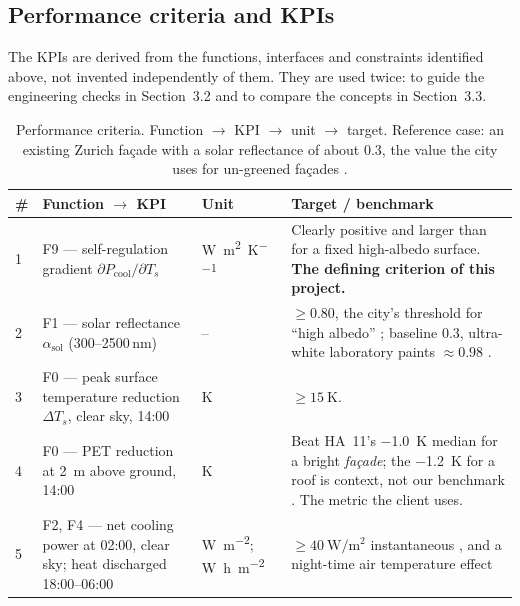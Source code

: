 \subsection{Performance criteria and KPIs}
\label{sec:kpi}

The KPIs are derived from the functions, interfaces and constraints identified
above, not invented independently of them. They are used twice: to guide the
engineering checks in Section~3.2 and to compare the concepts in Section~3.3.

\begin{table}[htbp]
\centering
\caption{Performance criteria. Function $\rightarrow$ KPI $\rightarrow$ unit
$\rightarrow$ target. Reference case: an existing Zurich façade with a solar
reflectance of about $0.3$, the value the city uses for un-greened façades
\parencite[114]{stadtzuerich2020}.}
\label{tab:kpi}
\renewcommand{\arraystretch}{1.05}
\footnotesize
\begin{tabularx}{\textwidth}{L{0.4cm} L{4.3cm} L{1.4cm} X}
\toprule
\textbf{\#} & \textbf{Function $\rightarrow$ KPI} & \textbf{Unit} & \textbf{Target / benchmark} \\
 & F9 --- self-regulation gradient
    $\partial P_\mathrm{cool}/\partial T_s$
  & \unit{\watt\per\square\metre\per\kelvin}
  & Clearly positive and larger than for a fixed high-albedo surface.
    \textbf{The defining criterion of this project.}  \\
2 & F1 --- solar reflectance $\alpha_\mathrm{sol}$ (300--2500\,nm)
  & --
  & $\geq 0.80$, the city's threshold for \enquote{high albedo}
    \parencite[128]{stadtzuerich2020}; baseline $0.3$, ultra-white laboratory
    paints $\approx 0.98$ \parencite{li2021}. \\
3 & F0 --- peak surface temperature reduction $\Delta T_s$, clear sky, 14:00
  & K
  & $\geq \qty{15}{\kelvin}$.  \\
4 & F0 --- PET reduction at \qty{2}{\metre} above ground, 14:00
  & K
  & Beat HA~11's \qty{-1.0}{\kelvin} median for a bright \emph{façade}; the
    \qty{-1.2}{\kelvin} for a roof is context, not our benchmark
    \parencite[Tab.~11]{stadtzuerich2020}. The metric the client uses. \\
5 & F2, F4 --- net cooling power at 02:00, clear sky; heat discharged
    18:00--06:00
  & \unit{\watt\per\square\metre}; \unit{\watt\hour\per\square\metre}
  & $\geq \qty{40}{\watt\per\square\metre}$ instantaneous
    \parencite{raman2014,zhai2017}, and a night-time air temperature effect

\end{tabularx}
\end{table}
